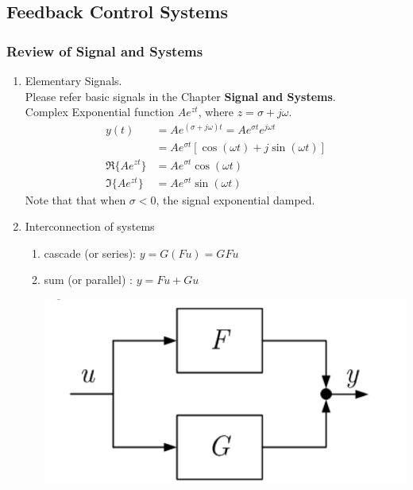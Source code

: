 \subsection{Feedback Control Systems}
\subsubsection{Review of Signal and Systems}
\begin{enumerate}
    \item Elementary Signals. \\
    Please refer basic signals in the Chapter \textbf{Signal and Systems}. \\
    Complex Exponential function $Ae^{zt}$, where $z = \sigma + j\omega$.
    \begin{align*}
        y(t) &= Ae^{(\sigma+j\omega)t} = Ae^{\sigma t}e^{j\omega t} \\
        &= Ae^{\sigma t}[\cos(\omega t) + j\sin(\omega t)] \\
        \Re\{Ae^{zt}\} &= Ae^{\sigma t}\cos(\omega t) \\
        \Im\{Ae^{zt}\} &= Ae^{\sigma t}\sin(\omega t)
    \end{align*}
    Note that that when $\sigma < 0$, the signal exponential damped.
    \item Interconnection of systems
    \begin{enumerate}
        \item cascade (or series): $\displaystyle y = G(Fu) = GFu$ \\
        \begin{center}
        \end{center}
        \item sum (or parallel) : $\displaystyle y = Fu + Gu$
        \begin{center}
            \includegraphics[width=0.5\linewidth]{image/sum.png}

\end{center}
\end{enumerate}
\end{enumerate}
